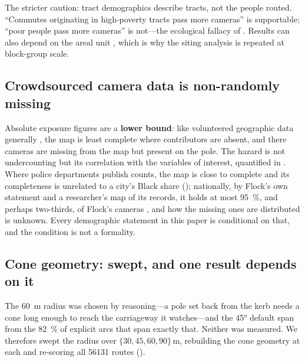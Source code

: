 \documentclass[11pt,twoside]{article}
\begin{document}
The stricter caution: tract demographics describe tracts, not the people routed.
``Commutes originating in high-poverty tracts pass more cameras'' is supportable; ``poor
people pass more cameras'' is not---the ecological fallacy of \citet{robinson1950}. Results can
also depend on the areal unit \citep{openshaw1984}, which is why the siting analysis is repeated
at block-group scale.

\subsection{Crowdsourced camera data is non-randomly missing}
\label{sec:coverage}

Absolute exposure figures are a \textbf{lower bound}: like volunteered geographic data
generally \citep{haklay2010,herfort2023}, the map is least complete where contributors are
absent, and there cameras are missing from the map but present on the pole. The hazard is not
undercounting but its correlation with the variables of interest, quantified in
. Where police departments publish counts, the map is close to
complete and its completeness is unrelated to a city's Black share ();
nationally, by Flock's own statement and a researcher's map of its records, it holds at most
\SI{95}{\percent}, and perhaps two-thirds, of Flock's cameras \citep{mazurov2026}, and how the missing ones are distributed is
unknown. Every demographic statement in this paper is conditional on that, and the condition is
not a formality.

\subsection{Cone geometry: swept, and one result depends on it}
\label{sec:lim:geom}

The \SI{60}{\metre} radius was chosen by reasoning---a pole set back from the kerb needs a
cone long enough to reach the carriageway it watches---and the \ang{45} default span from
the \SI{82}{\percent} of explicit arcs that span exactly that. Neither was measured. We
therefore swept the radius over $\{30, 45, 60, 90\}\,\si{\metre}$, rebuilding the cone
geometry at each and re-scoring all \num{56131} routes ().
\end{document}
